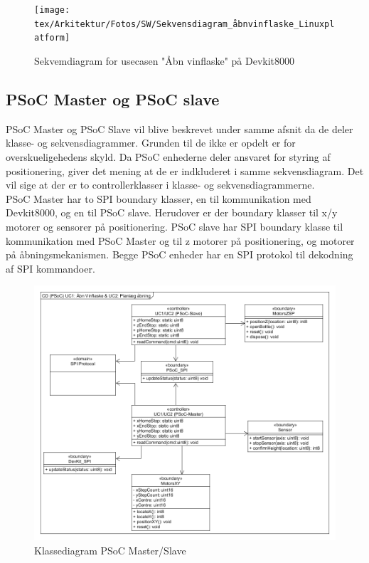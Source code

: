 \begin{figure}[H]
\texttt{[image: tex/Arkitektur/Fotos/SW/Sekvensdiagram\_åbnvinflaske\_Linuxplatform]}
\caption{Sekvemdiagram for usecasen "Åbn vinflaske" på Devkit8000}
\end{figure}

\subsection{PSoC Master og PSoC slave}
PSoC Master og PSoC Slave vil blive beskrevet under samme afsnit da de deler klasse- og sekvensdiagrammer. 
Grunden til de ikke er opdelt er for overskueligehedens skyld. Da PSoC enhederne deler ansvaret for styring af positionering, giver det mening at de er 
indkluderet i samme sekvensdiagram. Det vil sige at der er to controllerklasser i klasse- og sekvensdiagrammerne.\\ 

PSoC Master har to SPI boundary klasser, en til kommunikation med Devkit8000, og en til PSoC slave. Herudover er der boundary klasser til x/y motorer og 
sensorer på positionering. 
PSoC slave har SPI boundary klasse til kommunikation med PSoC Master og til z motorer på positionering, og motorer på åbningsmekanismen. Begge PSoC enheder har
en SPI protokol til dekodning af SPI kommandoer.\\

\begin{figure}[H]
\includegraphics[scale=0.4]{tex/Arkitektur/Fotos/SW/Klassediagram_PSoC}
\caption{Klassediagram PSoC Master/Slave}
\end{figure}

